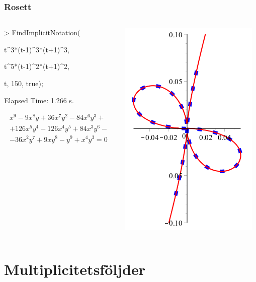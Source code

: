 \documentclass{beamer}
\begin{document}
\begin{frame}
	\frametitle{Rosett}
	\begin{example}
		\begin{columns}[onlytextwidth]
			\begin{column}{0.5\textwidth}
\begin{semiverbatim}
> FindImplicitNotation(

\qquad t\^{}3*(t-1)\^{}3*(t+1)\^{}3,

\qquad t\^{}5*(t-1)\^{}2*(t+1)\^{}2, 

\qquad t, 150, true);


Elapsed Time: 1.266 s.
\end{semiverbatim}
\[
\begin{array}{l}
x^9-9x^8y+36x^7y^2-84x^6y^3+\\
+126x^5y^4-126x^4y^5+84x^3y^6-\\
-36x^2y^7+9xy^8-y^9+x^4y^3 = 0
\end{array}
\]
			\end{column}
			\begin{column}{0.5\textwidth}
				\begin{center}
					\includegraphics[scale=0.6]{Export/implicitplot6_2.png}
				\end{center}
			\end{column}
		\end{columns}
	\end{example}
\end{frame}




\section{Multiplicitetsföljder}
\end{document}
